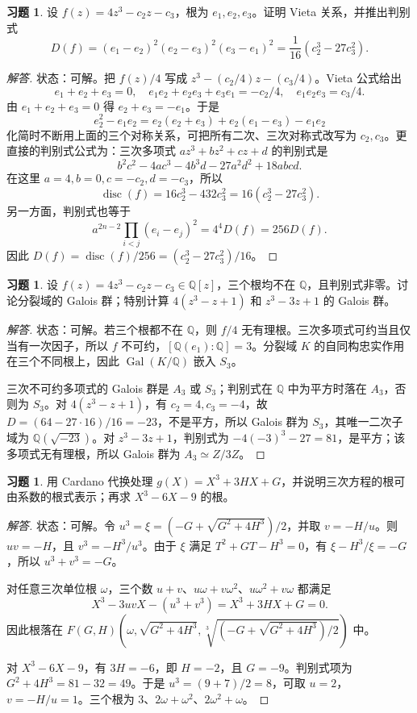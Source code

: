 \documentclass[11pt,a4paper,openany]{ctexbook}
\numberwithin{equation}{chapter}
\newcommand{\Q}{\mathbb{Q}}
\newcommand{\Gal}{\operatorname{Gal}}
\theoremstyle{plain}
\theoremstyle{definition}
\newtheorem{exercise}[theorem]{习题}
\theoremstyle{remark}
\begin{document}
\begin{exercise}
设 $f(z)=4z^3-c_2z-c_3$，根为 $e_1,e_2,e_3$。证明 Vieta 关系，并推出判别式
\[
D(f)=(e_1-e_2)^2(e_2-e_3)^2(e_3-e_1)^2=\frac1{16}(c_2^3-27c_3^2).
\]
\end{exercise}
\begin{proof}[解答]
状态：可解。把 $f(z)/4$ 写成 $z^3-(c_2/4)z-(c_3/4)$。Vieta 公式给出
\[
e_1+e_2+e_3=0,\quad e_1e_2+e_2e_3+e_3e_1=-c_2/4,\quad e_1e_2e_3=c_3/4.
\]
由 $e_1+e_2+e_3=0$ 得 $e_2+e_3=-e_1$。于是
\[
e_2^2-e_1e_2=e_2(e_2+e_3)+e_2(e_1-e_3)-e_1e_2
\]
化简时不断用上面的三个对称关系，可把所有二次、三次对称式改写为 $c_2,c_3$。更直接的判别式公式为：三次多项式 $az^3+bz^2+cz+d$ 的判别式是
\[
b^2c^2-4ac^3-4b^3d-27a^2d^2+18abcd.
\]
在这里 $a=4,b=0,c=-c_2,d=-c_3$，所以
\[
\operatorname{disc}(f)=16c_2^3-432c_3^2=16(c_2^3-27c_3^2).
\]
另一方面，判别式也等于
\[
a^{2n-2}\prod_{i<j}(e_i-e_j)^2=4^4D(f)=256D(f).
\]
因此 $D(f)=\operatorname{disc}(f)/256=(c_2^3-27c_3^2)/16$。
\end{proof}

\begin{exercise}
设 $f(z)=4z^3-c_2z-c_3\in\Q[z]$，三个根均不在 $\Q$，且判别式非零。讨论分裂域的 Galois 群；特别计算 $4(z^3-z+1)$ 和 $z^3-3z+1$ 的 Galois 群。
\end{exercise}
\begin{proof}[解答]
状态：可解。若三个根都不在 $\Q$，则 $f/4$ 无有理根。三次多项式可约当且仅当有一次因子，所以 $f$ 不可约，$[\Q(e_1):\Q]=3$。分裂域 $K$ 的自同构忠实作用在三个不同根上，因此 $\Gal(K/\Q)$ 嵌入 $S_3$。

三次不可约多项式的 Galois 群是 $A_3$ 或 $S_3$；判别式在 $\Q$ 中为平方时落在 $A_3$，否则为 $S_3$。对 $4(z^3-z+1)$，有 $c_2=4,c_3=-4$，故 $D=(64-27\cdot16)/16=-23$，不是平方，所以 Galois 群为 $S_3$，其唯一二次子域为 $\Q(\sqrt{-23})$。对 $z^3-3z+1$，判别式为 $-4(-3)^3-27=81$，是平方；该多项式无有理根，所以 Galois 群为 $A_3\simeq Z/3Z$。
\end{proof}

\begin{exercise}
用 Cardano 代换处理 $g(X)=X^3+3HX+G$，并说明三次方程的根可由系数的根式表示；再求 $X^3-6X-9$ 的根。
\end{exercise}
\begin{proof}[解答]
状态：可解。令 $u^3=\xi=(-G+\sqrt{G^2+4H^3})/2$，并取 $v=-H/u$。则 $uv=-H$，且 $v^3=-H^3/u^3$。由于 $\xi$ 满足 $T^2+GT-H^3=0$，有 $\xi-H^3/\xi=-G$，所以 $u^3+v^3=-G$。

对任意三次单位根 $\omega$，三个数 $u+v$、$u\omega+v\omega^2$、$u\omega^2+v\omega$ 都满足
\[
X^3-3uvX-(u^3+v^3)=X^3+3HX+G=0.
\]
因此根落在 $F(G,H)(\omega,\sqrt{G^2+4H^3},\sqrt[3]{(-G+\sqrt{G^2+4H^3})/2})$ 中。

对 $X^3-6X-9$，有 $3H=-6$，即 $H=-2$，且 $G=-9$。判别式项为 $G^2+4H^3=81-32=49$。于是 $u^3=(9+7)/2=8$，可取 $u=2$，$v=-H/u=1$。三个根为 $3$、$2\omega+\omega^2$、$2\omega^2+\omega$。
\end{proof}
\end{document}
